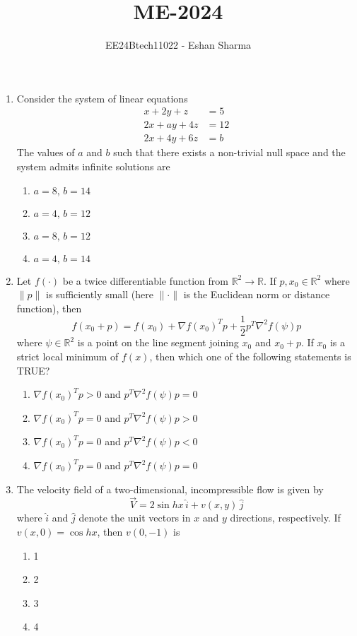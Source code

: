 \documentclass[journal,12pt,onecolumn]{IEEEtran}
\theoremstyle{remark}
\begin{document}

\vspace{3cm}

\title{ME-2024}
\author{EE24Btech11022 - Eshan Sharma}
\maketitle

\renewcommand{\thefigure}{\theenumi}
\renewcommand{\thetable}{\theenumi}



\begin{enumerate}
\item Consider the system of linear equations
\begin{align*}
	x + 2y + z &= 5 \\
	2x + ay + 4z &= 12 \\
	2x + 4y + 6z &= b
\end{align*}
The values of $a$ and $b$ such that there exists a non-trivial null space and the system admits infinite solutions are
\begin{enumerate}
	\item $a = 8, \, b = 14$
	\item $a = 4, \, b = 12$
	\item $a = 8, \, b = 12$
	\item $a = 4, \, b = 14$
\end{enumerate}

\item Let $f(\cdot)$ be a twice differentiable function from $\mathbb{R}^2 \rightarrow \mathbb{R}$. If $p, x_0 \in \mathbb{R}^2$ where $\|p\|$ is sufficiently small (here $\|\cdot\|$ is the Euclidean norm or distance function), then 
\[
f(x_0 + p) = f(x_0) + \nabla f(x_0)^T p + \frac{1}{2} p^T \nabla^2 f(\psi) p
\]
where $\psi \in \mathbb{R}^2$ is a point on the line segment joining $x_0$ and $x_0 + p$. If $x_0$ is a strict local minimum of $f(x)$, then which one of the following statements is TRUE?
\begin{enumerate}
	\item $\nabla f(x_0)^T p > 0$ and $p^T \nabla^2 f(\psi) p = 0$
	\item $\nabla f(x_0)^T p = 0$ and $p^T \nabla^2 f(\psi) p > 0$
	\item $\nabla f(x_0)^T p = 0$ and $p^T \nabla^2 f(\psi) p < 0$
	\item $\nabla f(x_0)^T p = 0$ and $p^T \nabla^2 f(\psi) p = 0$
\end{enumerate}

\item The velocity field of a two-dimensional, incompressible flow is given by
\[
\vec{V} = 2 \sin h x \, \hat{i} + v(x, y) \, \hat{j}
\]
where $\hat{i}$ and $\hat{j}$ denote the unit vectors in $x$ and $y$ directions, respectively. If $v(x, 0) = \cos h x$, then $v(0, -1)$ is
\begin{enumerate}
	\item 1
	\item 2
	\item 3
	\item 4
\end{enumerate}


\end{enumerate}
\end{document}
